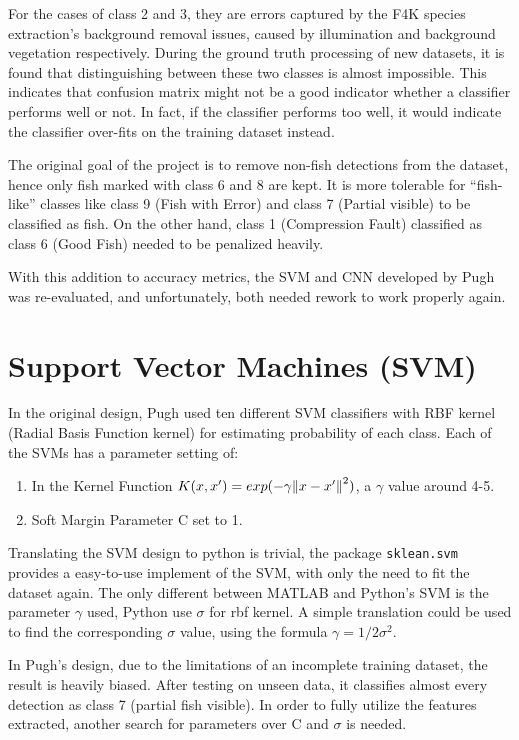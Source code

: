 \documentclass[bsc,logo,twoside,fullspacing,parskip]{infthesis}
\begin{document}
For the cases of class 2 and 3, they are errors captured by the F4K species extraction's background removal issues, caused by illumination and background vegetation respectively.
During the ground truth processing of new datasets, it is found that distinguishing between these two classes is almost impossible.
This indicates that confusion matrix might not be a good indicator whether a classifier performs well or not. In fact, if the classifier performs too well, it would indicate the classifier over-fits on the training dataset instead.

The original goal of the project is to remove non-fish detections from the dataset, hence only fish marked with class 6 and 8 are kept. 
It is more tolerable for ``fish-like'' classes like class 9 (Fish with Error) and class 7 (Partial visible) to be classified as fish.
On the other hand, class 1 (Compression Fault) classified as class 6 (Good Fish) needed to be penalized heavily. 

With this addition to accuracy metrics, the SVM and CNN developed by Pugh was re-evaluated, and unfortunately, both needed rework to work properly again.

\section{Support Vector Machines (SVM)}

In the original design, Pugh used ten different SVM classifiers with RBF kernel (Radial Basis Function kernel) for estimating probability of each class. Each of the SVMs has a parameter setting of:
\renewcommand{\labelenumi}{\bfseries\arabic{enumi}}
\begin{enumerate}
\setlength{\parskip}{1pt}
	\item In the Kernel Function \(K(x,x') = exp(-\gamma\norm{x-x'}^2)\), a \(\gamma\) value around 4-5.
	\item Soft Margin Parameter C set to 1.
\end{enumerate}
Translating the SVM design to python is trivial, the package {\tt sklean.svm} provides a easy-to-use implement of the SVM, with only the need to fit the dataset again.
The only different between MATLAB and Python's SVM is the parameter \(\gamma\) used, Python use \(\sigma\) for rbf kernel. A simple translation could be used to find the corresponding \(\sigma\) value, using the formula \( \gamma = 1/2\sigma^2 \).

In Pugh's design, due to the limitations of an incomplete training dataset, the result is heavily biased. After testing on unseen data, it classifies almost every detection as class 7 (partial fish visible). In order to fully utilize the features extracted, another search for parameters over C and \(\sigma\) is needed.
\end{document}
